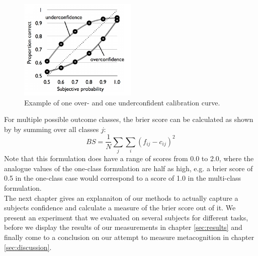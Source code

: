 \documentclass[../main/main.tex]{subfiles}
\begin{document}
	\begin{figure}[H]
		\centering
		\captionsetup{justification=centering}
		\includegraphics[width=0.5\textwidth]{../assets/calibration_curve.png}
		\caption{Example of one over- and one underconfident calibration curve.} 
		\label{fig:calibration}
	\end{figure}
	For multiple possible outcome classes, the brier score can be calculated as shown by \citep{brier1950verification} by summing over all classes $j$:
	\begin{equation}
		\label{eq:brier_score}
		BS = \frac{1}{N}\sum_j\sum_i(f_{ij} - c_{ij})^2
	\end{equation}
	Note that this formulation does have a range of scores from 0.0 to 2.0, where the analogue values of the one-class formulation are half as high, e.g. a brier score of 0.5 in the one-class case would correspond to a score of 1.0 in the multi-class formulation.\\
	The next chapter gives an explanaiton of our methods to actually capture a subjects confidence and calculate a measure of the brier score out of it. We present an experiment that we evaluated on several subjects for different tasks, before we display the results of our measurements in chapter \ref{sec:results} and finally come to a conclusion on our attempt to measure metacognition in chapter \ref{sec:discussion}.
	
\end{document}
